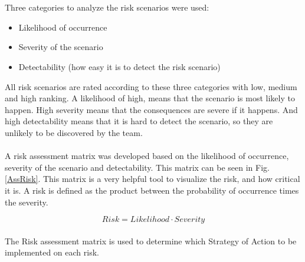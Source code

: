 \\\\\noindent
Three categories to analyze the risk scenarios were used:
\begin{itemize}
\item{Likelihood of occurrence}
\item{Severity of the scenario}
\item{Detectability (how easy it is to detect the risk scenario)}
\end{itemize}
All risk scenarios are rated according to these three categories with low, medium and high ranking. A likelihood of high, means that the scenario is most likely to happen. High severity means that the consequences are severe if it happens. And high detectability means that it is hard to detect the scenario, so they are unlikely to be discovered by the team.
\\\\
A risk assessment matrix was developed based on the likelihood of occurrence, severity of the scenario and detectability. This matrix can be seen in Fig. \ref{AssRisk}. This matrix is a very helpful tool to visualize the risk, and how critical it is. A risk is defined as the product between the probability of occurrence times the severity. 

$$Risk = Likelihood\cdot Severity$$ 
\\
The Risk assessment matrix is used to determine which Strategy of Action to be implemented on each risk. 

